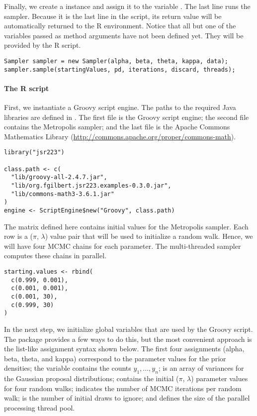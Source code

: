 Finally, we create a  instance and assign it to the variable . The last line runs the sampler. Because it is the last line in the script, its return value will be automatically returned to the R environment. Notice that all but one of the variables passed as method arguments have not been defined yet. They will be provided by the R script.
\begin{verbatim}
Sampler sampler = new Sampler(alpha, beta, theta, kappa, data);
sampler.sample(startingValues, pd, iterations, discard, threads);
\end{verbatim}

\paragraph{The R script} First, we instantiate a Groovy script engine. The paths to the required Java libraries are defined in . The first file is the Groovy script engine; the second file contains the Metropolis sampler; and the last file is the Apache Commons Mathematics Library (\url{http://commons.apache.org/proper/commons-math}).
\begin{verbatim}
library("jsr223")

class.path <- c(
  "lib/groovy-all-2.4.7.jar",
  "lib/org.fgilbert.jsr223.examples-0.3.0.jar",
  "lib/commons-math3-3.6.1.jar"
)
engine <- ScriptEngine$new("Groovy", class.path)
\end{verbatim}

The matrix  defined here contains initial values for the Metropolis sampler. Each row is a ($\pi$, $\lambda$) value pair that will be used to initialize a random walk. Hence, we will have four MCMC chains for each parameter. The multi-threaded sampler computes these chains in parallel.

\begin{verbatim}
starting.values <- rbind(
  c(0.999, 0.001),
  c(0.001, 0.001),
  c(0.001, 30),
  c(0.999, 30)
)
\end{verbatim}

In the next step, we initialize global variables that are used by the Groovy script. The  package provides a few ways to do this, but the most convenient approach is the list-like assignment syntax shown below. The first four assignments (alpha, beta, theta, and kappa) correspond to the parameter values for the prior densities; the variable  contains the counts $y_1,\dots,y_n$;  is an array of variances for the Gaussian proposal distributions;  contains the initial ($\pi$, $\lambda$) parameter values for four random walks;  indicates the number of MCMC iterations per random walk;  is the number of initial draws to ignore; and  defines the size of the parallel processing thread pool.

